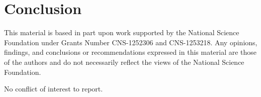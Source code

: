 \documentclass[journal,article,accept,moreauthors,pdftex,12pt,a4paper,energies]{mdpi}
\begin{document}
\section{Conclusion}
\label{sec:conclusion}



This material is based in part upon work supported by the 
National Science Foundation under Grants Number CNS-1252306 and CNS-1253218. 
Any opinions, findings, and conclusions or recommendations expressed in this material are those of the authors and do 
not necessarily reflect the views of the National Science Foundation.






No conflict of interest to report. 

%
%
%
%
%
%
%
%



\end{document}
